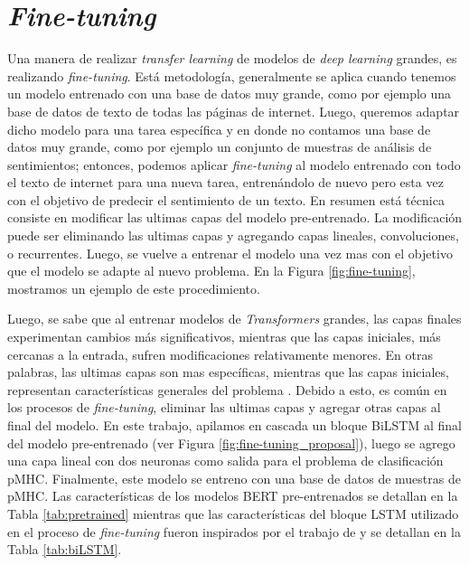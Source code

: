 \section{\textit{Fine-tuning}}\label{sec:fine-tuned}

Una manera de realizar \textit{transfer learning} de modelos de \textit{deep learning} grandes, es realizando \textit{fine-tuning}. Está metodología, generalmente se aplica cuando tenemos un modelo entrenado con una base de datos muy grande, como por ejemplo una base de datos de texto de todas las páginas de internet. Luego, queremos adaptar dicho modelo para una tarea específica y en donde no contamos una base de datos muy grande, como por ejemplo un conjunto de muestras de análisis de sentimientos; entonces, podemos aplicar \textit{fine-tuning} al modelo entrenado con todo el texto de internet para una nueva tarea, entrenándolo de nuevo pero esta vez con el objetivo de predecir el sentimiento de un texto. En resumen está técnica consiste en modificar las ultimas capas del modelo pre-entrenado. La modificación puede ser eliminando las ultimas capas y agregando capas lineales, convoluciones, o recurrentes. Luego, se vuelve a entrenar el modelo una vez mas con el objetivo que el modelo se adapte al nuevo problema. En la Figura \ref{fig:fine-tuning}, mostramos un ejemplo de este procedimiento.

Luego, se sabe que al entrenar modelos de \textit{Transformers} grandes, las capas finales experimentan cambios más significativos, mientras que las capas iniciales, más cercanas a la entrada, sufren modificaciones relativamente menores. En otras palabras, las ultimas capas son mas específicas, mientras que las capas iniciales, representan características generales del problema \citep{merchant2020happens,lee2019would,kovaleva2019revealing}. Debido a esto, es común en los procesos de \textit{fine-tuning}, eliminar las ultimas capas y agregar otras capas al final del modelo. En este trabajo,  apilamos en cascada un bloque BiLSTM al final del modelo pre-entrenado (ver Figura \ref{fig:fine-tuning_proposal}), luego se agrego una capa lineal con dos neuronas como salida para el problema de clasificación pMHC. Finalmente, este modelo se entreno con una base de datos de muestras de pMHC. Las características de los modelos BERT pre-entrenados se detallan en la Tabla \ref{tab:pretrained} mientras que las características del bloque LSTM utilizado en el proceso de \textit{fine-tuning} fueron inspirados por el trabajo de \cite{zhang2022hlab} y se detallan en la Tabla \ref{tab:biLSTM}.

